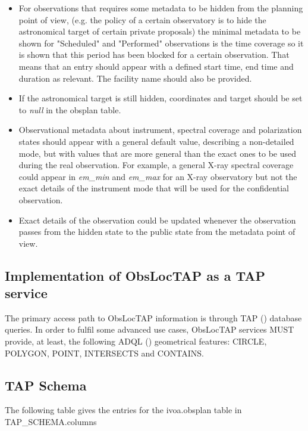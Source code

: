\documentclass[11pt,a4paper]{ivoa}
\begin{document}
\begin{itemize}
	\item{For observations that requires some metadata to be hidden from the
	 planning point of view, (e.g. the policy of a certain observatory is to
	 hide the astronomical target of certain private proposals) the minimal
	 metadata to be shown for "Scheduled" and "Performed" observations is the
	 time coverage so it is shown that this period has been blocked for a
	 certain observation.
	 That means that an entry should appear with a defined start time, end time
	 and duration as relevant. The facility name should also be provided.}
	 
	\item{If the astronomical target is still hidden, coordinates and target
  should be set to \textit{null} in the obsplan table.}

	\item{Observational metadata about instrument, spectral coverage and
  polarization states should appear with a general default value, describing a
  non-detailed mode, but with values that are more general than the exact ones
  to be used during the real observation. For example, a general X-ray spectral
  coverage could appear in \textit{em\_min} and \textit{em\_max} for an X-ray
  observatory but not the exact details of the instrument mode that will be used
  for the confidential observation.}

	\item{Exact details of the observation could be updated whenever the
  observation passes from the hidden state to the public state from the
  metadata point of view.}

\end{itemize}

\subsection{Implementation of ObsLocTAP as a TAP service}
The primary access path to ObsLocTAP information is through TAP
(\citealt{2010ivoa.spec.0327D}) database queries. In order to fulfil some advanced
use cases, ObsLocTAP services MUST provide, at least, the following ADQL
(\citealt{2008ivoa.spec.1030O}) geometrical features: CIRCLE, POLYGON, POINT, INTERSECTS and CONTAINS.\par

\subsection{TAP Schema}
The following table gives the entries for the ivoa.obsplan table in\\
TAP\_SCHEMA.columns
\end{document}
